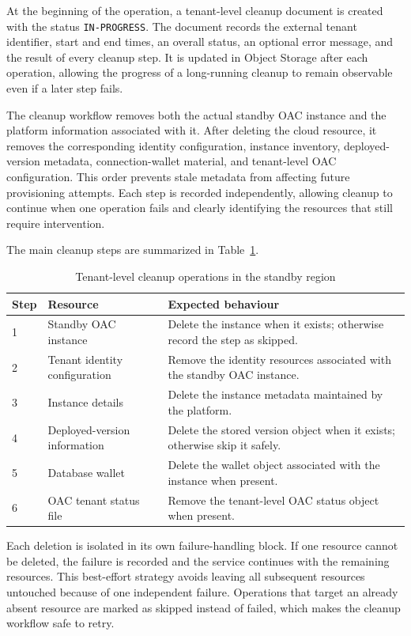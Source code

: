 At the beginning of the operation, a tenant-level cleanup document is created with the status \texttt{IN-PROGRESS}. The document records the external tenant identifier, start and end times, an overall status, an optional error message, and the result of every cleanup step. It is updated in Object Storage after each operation, allowing the progress of a long-running cleanup to remain observable even if a later step fails.

The cleanup workflow removes both the actual standby OAC instance and the
platform information associated with it. After deleting the cloud resource,
it removes the corresponding identity configuration, instance inventory,
deployed-version metadata, connection-wallet material, and tenant-level OAC
configuration. This order prevents stale metadata from affecting future
provisioning attempts. Each step is recorded independently, allowing cleanup
to continue when one operation fails and clearly identifying the resources
that still require intervention.

The main cleanup steps are summarized in Table~\ref{tab:dr-cleanup-steps}.

\begin{table}[H]
\centering
\caption{Tenant-level cleanup operations in the standby region}
\label{tab:dr-cleanup-steps}
\begin{tabularx}{\textwidth}{@{}p{1.2cm}X X@{}}
\toprule
\textbf{Step} & \textbf{Resource} & \textbf{Expected behaviour} \\
\midrule
1 & Standby OAC instance & Delete the instance when it exists; otherwise record the step as skipped. \\
2 & Tenant identity configuration & Remove the identity resources associated with the standby OAC instance. \\
3 & Instance details & Delete the instance metadata maintained by the platform. \\
4 & Deployed-version information & Delete the stored version object when it exists; otherwise skip it safely. \\
5 & Database wallet & Delete the wallet object associated with the instance when present. \\
6 & OAC tenant status file & Remove the tenant-level OAC status object when present. \\
\bottomrule
\end{tabularx}
\end{table}

Each deletion is isolated in its own failure-handling block. If one resource cannot be deleted, the failure is recorded and the service continues with the remaining resources. This best-effort strategy avoids leaving all subsequent resources untouched because of one independent failure. Operations that target an already absent resource are marked as skipped instead of failed, which makes the cleanup workflow safe to retry.

